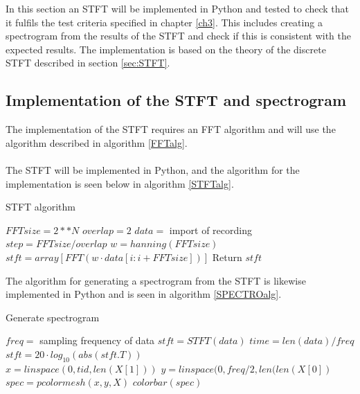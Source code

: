In this section an STFT will be implemented in Python and tested to check that it fulfils the test criteria specified in chapter \ref{ch3}. This includes creating a spectrogram from the results of the STFT and check if this is consistent with the expected results. The implementation is based on the theory of the discrete STFT described in section \ref{sec:STFT}.

\subsection{Implementation of the STFT and spectrogram}
The implementation of the STFT requires an FFT algorithm and will use the algorithm described in algorithm \ref{FFTalg}.
\\ \\
The STFT will be implemented in Python, and the algorithm for the implementation is seen below in algorithm \ref{STFTalg}.
\begin{algorithm}[H]
\caption{STFT algorithm}
\label{STFTalg}
\begin{algorithmic}[1]
\State $FFTsize=2**N$ 
\State $overlap=2$ 
\State $data=$ import of recording \\
\State $step=FFTsize/overlap$
\State $w=hanning(FFTsize)$ 
\State $stft = array[FFT(w\cdot data[i:i+FFTsize])]$
\EndFor
\State Return $stft$
\EndProcedure
\end{algorithmic}
\end{algorithm}

The algorithm for generating a spectrogram from the STFT is likewise implemented in Python and is seen in algorithm \ref{SPECTROalg}.
\begin{algorithm}[H]
\caption{Generate spectrogram}
\label{SPECTROalg}
\begin{algorithmic}[1]
\State $freq=$ sampling frequency of data
\State $stft=STFT(data)$ 
\State $time=len(data)/freq$ 
\State $stft=20\cdot log_{10}(abs(stft.T))$ \\
\State $x=linspace(0,tid,len(X[1]))$ 
\State $y=linspace(0,freq/2,len(len(X[0])$ \\
\State $spec=pcolormesh(x,y,X)$ 
\State $colorbar(spec)$ 
\end{algorithmic}
\end{algorithm}

